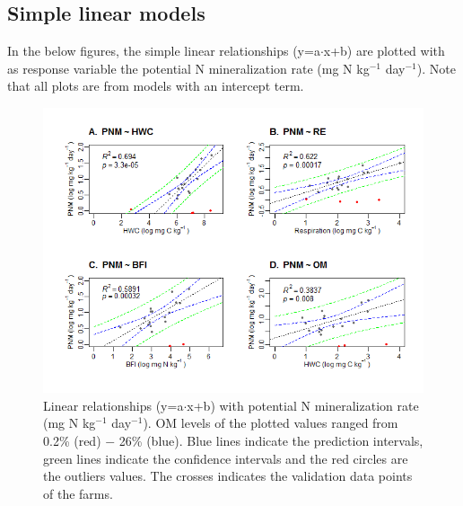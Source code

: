 \documentclass[10pt,twoside,dutch,english]{report}
\begin{document}
\begin{appendices}
\section{Simple linear models}
\label{chap: Simple linear models}
In the below figures, the simple linear relationships (y=a$\cdot$x+b) are plotted with as response variable the potential N mineralization rate (mg N kg$^{-1}$ day$^{-1}$). Note that all plots are from models with an intercept term.
\begin{figure}[h] %
	\includegraphics[width=1\linewidth]{results_models}
	\caption{Linear relationships (y=a$\cdot$x+b) with potential N mineralization rate (mg N kg$^{-1}$ day$^{-1}$). OM levels of the plotted values ranged from 0.2\% (red) $-$ 26\% (blue).  Blue lines indicate the prediction intervals, green lines indicate the confidence intervals and the red circles are the outliers values. The crosses indicates the validation data points of the farms. }
	\label{fig:results_models}
\end{figure}
    

\end{appendices}
\end{document}
